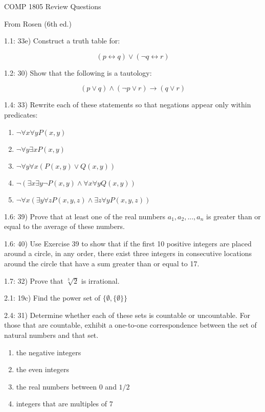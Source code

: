\documentclass{article}
\begin{document}
{\Huge COMP 1805 Review Questions}

From Rosen (6th ed.)

1.1: 33e) Construct a truth table for:

\[
(p \leftrightarrow q) \vee (\neg q \leftrightarrow r)
\]

1.2: 30) Show that the following is a tautology:

\[
(p \vee q) \wedge (\neg p \vee r) \rightarrow (q \vee r)
\]

1.4: 33) Rewrite each of these statements so that negations appear only within predicates:

\begin{enumerate}[label=\alph{enumi})]
\item $ \neg \forall x \forall y P(x,y) $
\item $ \neg \forall y \exists x P(x,y) $
\item $ \neg \forall y \forall x (P(x,y) \vee Q(x,y)) $
\item $ \neg ( \exists x \exists y \neg P(x,y) \wedge \forall x \forall y Q(x,y)) $
\item $ \neg \forall x ( \exists y \forall z P(x,y,z) \wedge \exists z \forall y P(x,y,z)) $
\end{enumerate}

1.6: 39) Prove that at least one of the real numbers $a_1,a_2,...,a_n$ is greater than or equal to the average of these numbers.

1.6: 40) Use Exercise 39 to show that if the first 10 positive integers are placed around a circle, in any order, there exist three integers in consecutive locations around the circle that have a sum greater than or equal to 17.

1.7: 32) Prove that $\sqrt[3]{2}$ is irrational.

2.1: 19c) Find the power set of $ \{ \emptyset , \{ \emptyset \} \} $

2.4: 31) Determine whether each of these sets is countable or uncountable.  For those that are countable, exhibit a one-to-one correspondence between the set of natural numbers and that set.

\begin{enumerate}[label=\alph{enumi})]
\item the negative integers
\item the even integers
\item the real numbers between 0 and $1/2$
\item integers that are multiples of 7
\end{enumerate}
\end{document}
